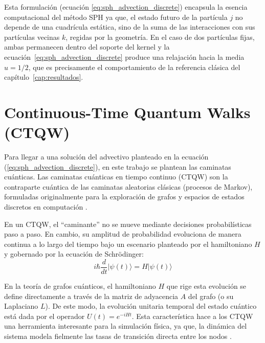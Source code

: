 Esta formulación (ecuación \ref{eq:sph_advection_discrete}) encapsula la esencia computacional del método SPH ya que, el estado futuro de la partícula $j$ no depende de una cuadrícula estática, sino de la suma de las interacciones con sus partículas vecinas $k$, regidas por la geometría. En el caso de dos partículas fijas, ambas permanecen dentro del soporte del kernel y la ecuación~\eqref{eq:sph_advection_discrete} produce una relajación hacia la media $u=1/2$, que es precisamente el comportamiento de la referencia clásica del capítulo~\ref{cap:resultados}.



\section{Continuous-Time Quantum Walks (CTQW)}
Para llegar a una solución del advectivo planteado en la ecuación (\ref{eq:sph_advection_discrete}), en este trabajo se plantean las caminatas cuánticas. Las caminatas cuánticas en tiempo continuo (CTQW) son la contraparte cuántica de las caminatas aleatorias clásicas (procesos de Markov), formuladas originalmente para la exploración de grafos y espacios de estados discretos en computación \cite{VenegasAndraca2012}.

En un CTQW, el ``caminante'' no se mueve mediante decisiones probabilísticas paso a paso. En cambio, su amplitud de probabilidad evoluciona de manera continua a lo largo del tiempo bajo un escenario planteado por el hamiltoniano $H$ y gobernado por la ecuación de Schrödinger:
\begin{equation}
    i\hbar \frac{d}{dt} |\psi(t)\rangle = H |\psi(t)\rangle
\end{equation}

En la teoría de grafos cuánticos, el hamiltoniano $H$ que rige esta evolución se define directamente a través de la matriz de adyacencia $A$ del grafo (o su Laplaciano $L$). De este modo, la evolución unitaria temporal del estado cuántico está dada por el operador $U(t) = e^{-iHt}$. Esta característica hace a los CTQW una herramienta interesante para la simulación física, ya que, la dinámica del sistema modela fielmente las tasas de transición directa entre los nodos \cite{VenegasAndraca2012}.
